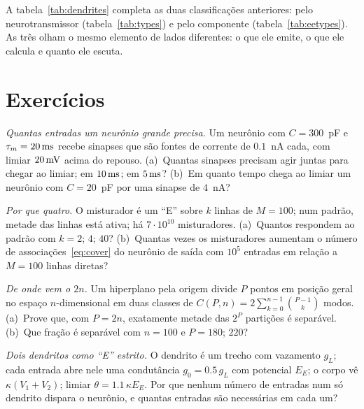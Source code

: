 A tabela~\ref{tab:dendrites} completa as duas classificações anteriores: pelo neurotransmissor (tabela~\ref{tab:types}) e pelo componente (tabela~\ref{tab:eetypes}). As três olham o mesmo elemento de lados diferentes: o que ele emite, o que ele calcula e quanto ele escuta.

\section{Exercícios}

\begin{exercise}[\lvlA]
\label{ex:19:1}
\emph{Quantas entradas um neurônio grande precisa.} Um neurônio com $C=300$~pF e $\tau_m=20\,\text{ms}$ recebe sinapses que são fontes de corrente de $0.1$~nA cada, com limiar $20\,\text{mV}$ acima do repouso. (a)~Quantas sinapses precisam agir juntas para chegar ao limiar; em $10\,\text{ms}$; em $5\,\text{ms}$? (b)~Em quanto tempo chega ao limiar um neurônio com $C=20$~pF por uma sinapse de $4$~nA?
\end{exercise}

\begin{exercise}[\lvlA]
\label{ex:19:2}
\emph{Por que quatro.} O misturador é um ``E'' sobre $k$ linhas de $M=100$; num padrão, metade das linhas está ativa; há $7\cdot10^{10}$ misturadores. (a)~Quantos respondem ao padrão com $k=2$; $4$; $40$? (b)~Quantas vezes os misturadores aumentam o número de associações~\eqref{eq:cover} do neurônio de saída com $10^5$ entradas em relação a $M=100$ linhas diretas?
\end{exercise}

\begin{exercise}[\lvlB]
\label{ex:19:3}
\emph{De onde vem o $2n$.} Um hiperplano pela origem divide $P$ pontos em posição geral no espaço $n$-dimensional em duas classes de $C(P,n)=2\sum_{k=0}^{n-1}\binom{P-1}{k}$ modos. (a)~Prove que, com $P=2n$, exatamente metade das $2^P$ partições é separável. (b)~Que fração é separável com $n=100$ e $P=180$; $220$?
\end{exercise}

\begin{exercise}[\lvlB]
\label{ex:19:4}
\emph{Dois dendritos como ``E'' estrito.} O dendrito é um trecho com vazamento $g_L$; cada entrada abre nele uma condutância $g_0=0.5\,g_L$ com potencial $E_E$; o corpo vê $\kappa(V_1+V_2)$; limiar $\theta=1.1\,\kappa E_E$. Por que nenhum número de entradas num só dendrito dispara o neurônio, e quantas entradas são necessárias em cada um?
\end{exercise}

